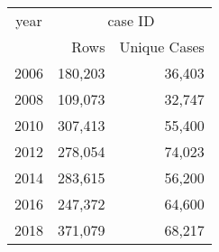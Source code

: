 \footnotesize\begin{tabular}[t]{lrr}
\toprule
\multicolumn{1}{c}{year} & \multicolumn{2}{c}{case ID} \\
\cmidrule(l{3pt}r{3pt}){1-1} \cmidrule(l{3pt}r{3pt}){2-3}
  & Rows & Unique Cases\\
\midrule
2006 & 180,203 & 36,403\\
2008 & 109,073 & 32,747\\
2010 & 307,413 & 55,400\\
2012 & 278,054 & 74,023\\
2014 & 283,615 & 56,200\\
2016 & 247,372 & 64,600\\
2018 & 371,079 & 68,217\\
\bottomrule
\end{tabular}
